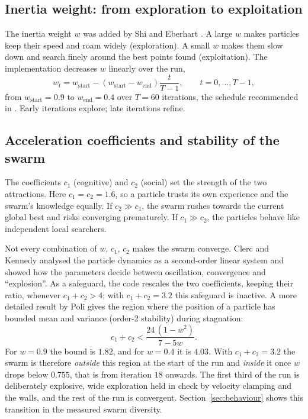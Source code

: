 \documentclass[11pt,a4paper]{article}
\begin{document}
\subsection{Inertia weight: from exploration to exploitation}

The inertia weight $w$ was added by Shi and Eberhart \cite{shi1998}. A large $w$ makes particles keep their
speed and roam widely (exploration). A small $w$ makes them slow down and search finely around the best
points found (exploitation). The implementation decreases $w$ linearly over the run,
\begin{equation}
w_t = w_{\mathrm{start}} - \left(w_{\mathrm{start}} - w_{\mathrm{end}}\right)\frac{t}{T - 1},
\qquad t = 0, \ldots, T-1,
\label{eq:inertia}
\end{equation}
from $w_{\mathrm{start}} = 0.9$ to $w_{\mathrm{end}} = 0.4$ over $T = 60$ iterations, the schedule
recommended in \cite{shi1998}. Early iterations explore; late iterations refine.

\subsection{Acceleration coefficients and stability of the swarm}

The coefficients $c_1$ (cognitive) and $c_2$ (social) set the strength of the two attractions. Here
$c_1 = c_2 = 1.6$, so a particle trusts its own experience and the swarm's knowledge equally. If
$c_2 \gg c_1$, the swarm rushes towards the current global best and risks converging prematurely. If
$c_1 \gg c_2$, the particles behave like independent local searchers.

Not every combination of $w$, $c_1$, $c_2$ makes the swarm converge. Clerc and Kennedy \cite{clerc2002}
analysed the particle dynamics as a second-order linear system and showed how the parameters decide
between oscillation, convergence and ``explosion''. As a safeguard, the code rescales the two coefficients,
keeping their ratio, whenever $c_1 + c_2 > 4$; with $c_1 + c_2 = 3.2$ this safeguard is inactive. A more
detailed result by Poli \cite{poli2009} gives the region where the position of a particle has bounded mean
and variance (order-2 stability) during stagnation:
\begin{equation}
c_1 + c_2 < \frac{24\,(1 - w^2)}{7 - 5w}.
\label{eq:poli}
\end{equation}
For $w = 0.9$ the bound is $1.82$, and for $w = 0.4$ it is $4.03$. With $c_1 + c_2 = 3.2$ the swarm is
therefore \emph{outside} this region at the start of the run and \emph{inside} it once $w$ drops below
$0.755$, that is from iteration $18$ onwards. The first third of the run is deliberately explosive, wide
exploration held in check by velocity clamping and the walls, and the rest of the run is convergent.
Section~\ref{sec:behaviour} shows this transition in the measured swarm diversity.
\end{document}
